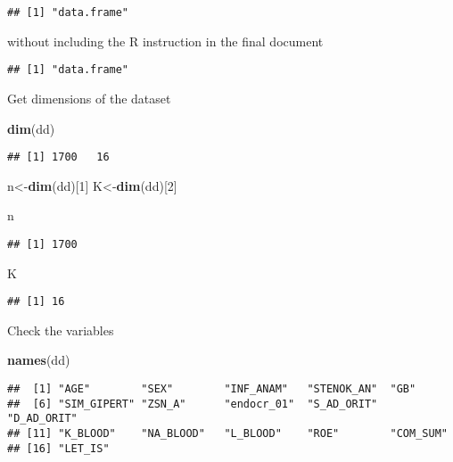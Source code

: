\documentclass[
]{article}
\newenvironment{Shaded}{\begin{snugshade}}{\end{snugshade}}
\newcommand{\DecValTok}[1]{\textcolor[rgb]{0.00,0.00,0.81}{#1}}
\newcommand{\FunctionTok}[1]{\textcolor[rgb]{0.13,0.29,0.53}{\textbf{#1}}}
\newcommand{\NormalTok}[1]{#1}
\newcommand{\OtherTok}[1]{\textcolor[rgb]{0.56,0.35,0.01}{#1}}
\begin{document}
\begin{verbatim}
## [1] "data.frame"
\end{verbatim}

without including the R instruction in the final document

\begin{verbatim}
## [1] "data.frame"
\end{verbatim}

Get dimensions of the dataset

\begin{Shaded}
\begin{Highlighting}[]
\FunctionTok{dim}\NormalTok{(dd)}
\end{Highlighting}
\end{Shaded}

\begin{verbatim}
## [1] 1700   16
\end{verbatim}

\begin{Shaded}
\begin{Highlighting}[]
\NormalTok{n}\OtherTok{\textless{}{-}}\FunctionTok{dim}\NormalTok{(dd)[}\DecValTok{1}\NormalTok{]}
\NormalTok{K}\OtherTok{\textless{}{-}}\FunctionTok{dim}\NormalTok{(dd)[}\DecValTok{2}\NormalTok{]}

\NormalTok{n}
\end{Highlighting}
\end{Shaded}

\begin{verbatim}
## [1] 1700
\end{verbatim}

\begin{Shaded}
\begin{Highlighting}[]
\NormalTok{K}
\end{Highlighting}
\end{Shaded}

\begin{verbatim}
## [1] 16
\end{verbatim}

Check the variables

\begin{Shaded}
\begin{Highlighting}[]
\FunctionTok{names}\NormalTok{(dd)}
\end{Highlighting}
\end{Shaded}

\begin{verbatim}
##  [1] "AGE"        "SEX"        "INF_ANAM"   "STENOK_AN"  "GB"        
##  [6] "SIM_GIPERT" "ZSN_A"      "endocr_01"  "S_AD_ORIT"  "D_AD_ORIT" 
## [11] "K_BLOOD"    "NA_BLOOD"   "L_BLOOD"    "ROE"        "COM_SUM"   
## [16] "LET_IS"
\end{verbatim}
\end{document}
